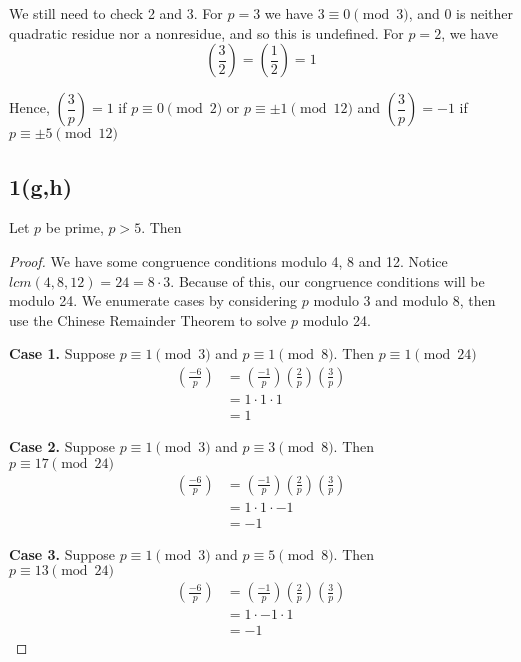 We still need to check 2 and 3. For $p=3$ we have $3 \equiv 0 \pmod{3}$, and 0
is neither quadratic residue nor a nonresidue, and so this is undefined. For
$p=2$, we have 
\[ \left( \frac{3}{2} \right) = \left( \frac{1}{2} \right) = 1 \]

Hence, $\left( \dfrac{3}{p} \right)  = 1$ if $p \equiv 0 \pmod 2 $ or $p
\equiv \pm 1 \pmod{12}$ and $\left( \dfrac{3}{p} \right)  = -1$ if 
$p \equiv \pm 5 \pmod{12}$


\subsection{1(g,h)}
\begin{lemma}
	Let $p$ be prime, $p > 5$. Then
\end{lemma}
\begin{proof}
We have some congruence conditions modulo 4, 8 and 12. Notice $lcm(4, 8,
12) = 24 = 8 \cdot 3$. Because of this, our congruence conditions will be modulo
24. We enumerate cases by considering $p$ modulo 3 and modulo 8, then use the
Chinese Remainder Theorem to solve $p$ modulo 24.

\textbf{Case 1.}
Suppose $p \equiv 1 \pmod{3}$ and $p \equiv 1 \pmod{8}$. Then 
$p \equiv 1 \pmod{24}$
\begin{align*}
\left( \frac{-6}{p} \right) 
&= \left( \frac{-1}{p} \right) \left( \frac{2}{p} \right) \left( \frac{3}{p} \right) \\
&= 1 \cdot 1 \cdot 1 \\
&= 1
\end{align*}

\textbf{Case 2.}
Suppose $p \equiv 1 \pmod{3}$ and $p \equiv 3 \pmod{8}$. Then \\
$p \equiv 17 \pmod{24}$
\begin{align*}
\left( \frac{-6}{p} \right) 
&= \left( \frac{-1}{p} \right) \left( \frac{2}{p} \right) \left( \frac{3}{p} \right) \\
&= 1 \cdot 1 \cdot -1 \\
&= -1
\end{align*}

\textbf{Case 3.}
Suppose $p \equiv 1 \pmod{3}$ and $p \equiv 5 \pmod{8}$. Then \\
$p \equiv 13 \pmod{24}$
\begin{align*}
\left( \frac{-6}{p} \right) 
&= \left( \frac{-1}{p} \right) \left( \frac{2}{p} \right) \left( \frac{3}{p} \right) \\
&= 1 \cdot -1 \cdot 1 \\
&= -1
\end{align*}


\end{proof}

